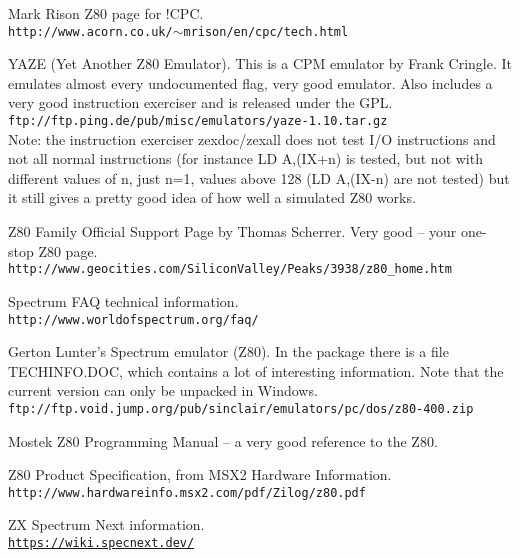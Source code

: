 \documentclass[12pt,twoside,openright,a4paper]{book}
\begin{document}
\begin{thebibliography}{}

	  Mark Rison Z80 page for !CPC. \\
	{\tt \small http://www.acorn.co.uk/$\sim$mrison/en/cpc/tech.html}

	 YAZE (Yet Another Z80 Emulator). This is a CPM emulator by Frank Cringle. It emulates almost every undocumented flag, very good emulator. Also includes a very good instruction exerciser and is released under the GPL. \\
	{\tt \small ftp://ftp.ping.de/pub/misc/emulators/yaze-1.10.tar.gz} \\
	Note: the instruction exerciser zexdoc/zexall does not test I/O instructions and not all normal instructions (for instance LD A,(IX+n) is tested, but not with different values of n, just n=1, values above 128 (LD A,(IX-n) are not tested) but it still gives a pretty good idea of how well a simulated Z80 works.

	 Z80 Family Official Support Page by Thomas Scherrer. Very good -- your one-stop Z80 page. \\
	{\tt \small http://www.geocities.com/SiliconValley/Peaks/3938/z80\_home.htm}

	 Spectrum FAQ technical information. \\
	{\tt \small http://www.worldofspectrum.org/faq/}

	 Gerton Lunter's Spectrum emulator (Z80). In the package there is a file TECHINFO.DOC, which contains a lot of interesting information. Note that the current version can only be unpacked in Windows. \\
	{\tt \small ftp://ftp.void.jump.org/pub/sinclair/emulators/pc/dos/z80-400.zip}

	 Mostek Z80 Programming Manual -- a very good reference to the Z80.

	 Z80 Product Specification, from MSX2 Hardware Information. \\
	{\tt \small http://www.hardwareinfo.msx2.com/pdf/Zilog/z80.pdf}

	 ZX Spectrum Next information. \\
	{\tt \small \url{https://wiki.specnext.dev/}}

\end{thebibliography}

\pagebreak
\IntentionallyEmpty
\pagebreak
\end{document}
